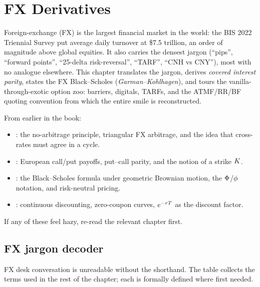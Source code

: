 \chapter{FX Derivatives}
\label{ch:fx_derivatives}

Foreign-exchange (FX) is the largest financial market in the world:
the BIS 2022 Triennial Survey put average daily turnover at \$7.5
trillion, an order of magnitude above global equities.  It also
carries the densest jargon (``pips'', ``forward points'',
``25-delta risk-reversal'', ``TARF'', ``CNH vs CNY''), most with
no analogue elsewhere.  This chapter translates the jargon, derives
\emph{covered interest parity}, states the FX Black--Scholes
(\emph{Garman--Kohlhagen}), and tours the vanilla-through-exotic
option zoo: barriers, digitals, TARFs, and the ATMF/RR/BF quoting
convention from which the entire smile is reconstructed.

\begin{backgroundbox}[Prerequisites]
From earlier in the book:
\begin{itemize}
  \item {}: the no-arbitrage principle, triangular
    FX arbitrage, and the idea that cross-rates must agree in a
    cycle.
  \item {}: European call/put payoffs,
    put--call parity, and the notion of a strike $K$.
  \item {}: the Black--Scholes formula under
    geometric Brownian motion, the $\Phi$/$\phi$ notation, and
    risk-neutral pricing.
  \item {}: continuous discounting,
    zero-coupon curves, $e^{-r T}$ as the discount factor.
\end{itemize}
If any of these feel hazy, re-read the relevant chapter first.
\end{backgroundbox}


\section{FX jargon decoder}
\label{sec:fx_jargon}

FX desk conversation is unreadable without the shorthand.  The
table collects the terms used in the rest of the chapter; each is
formally defined where first needed.

